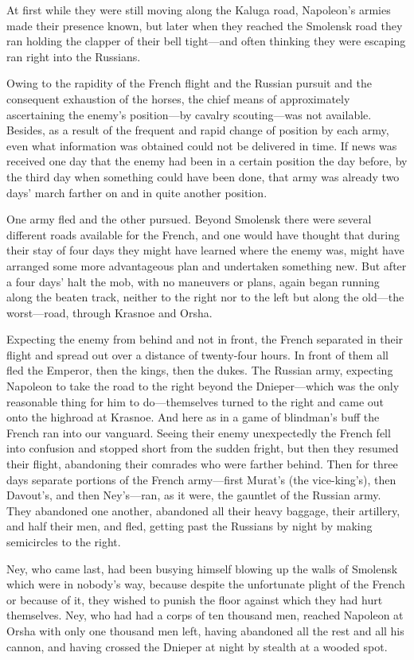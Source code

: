 At first while they were still moving along the Kaluga road,
Napoleon's armies made their presence known, but later when they
reached the Smolensk road they ran holding the clapper of their
bell tight---and often thinking they were escaping ran right into
the Russians.

Owing to the rapidity of the French flight and the Russian
pursuit and the consequent exhaustion of the horses, the chief
means of approximately ascertaining the enemy's position---by
cavalry scouting---was not available. Besides, as a result of the
frequent and rapid change of position by each army, even what
information was obtained could not be delivered in time. If news
was received one day that the enemy had been in a certain
position the day before, by the third day when something could
have been done, that army was already two days' march farther on
and in quite another position.

One army fled and the other pursued. Beyond Smolensk there were
several different roads available for the French, and one would
have thought that during their stay of four days they might have
learned where the enemy was, might have arranged some more
advantageous plan and undertaken something new. But after a four
days' halt the mob, with no maneuvers or plans, again began
running along the beaten track, neither to the right nor to the
left but along the old---the worst---road, through Krasnoe and
Orsha.

Expecting the enemy from behind and not in front, the French
separated in their flight and spread out over a distance of
twenty-four hours. In front of them all fled the Emperor, then
the kings, then the dukes. The Russian army, expecting Napoleon
to take the road to the right beyond the Dnieper---which was the
only reasonable thing for him to do---themselves turned to the
right and came out onto the highroad at Krasnoe. And here as in a
game of blindman's buff the French ran into our vanguard. Seeing
their enemy unexpectedly the French fell into confusion and
stopped short from the sudden fright, but then they resumed their
flight, abandoning their comrades who were farther behind.  Then
for three days separate portions of the French army---first
Murat's (the vice-king's), then Davout's, and then Ney's---ran,
as it were, the gauntlet of the Russian army. They abandoned one
another, abandoned all their heavy baggage, their artillery, and
half their men, and fled, getting past the Russians by night by
making semicircles to the right.

Ney, who came last, had been busying himself blowing up the walls
of Smolensk which were in nobody's way, because despite the
unfortunate plight of the French or because of it, they wished to
punish the floor against which they had hurt themselves. Ney, who
had had a corps of ten thousand men, reached Napoleon at Orsha
with only one thousand men left, having abandoned all the rest
and all his cannon, and having crossed the Dnieper at night by
stealth at a wooded spot.

